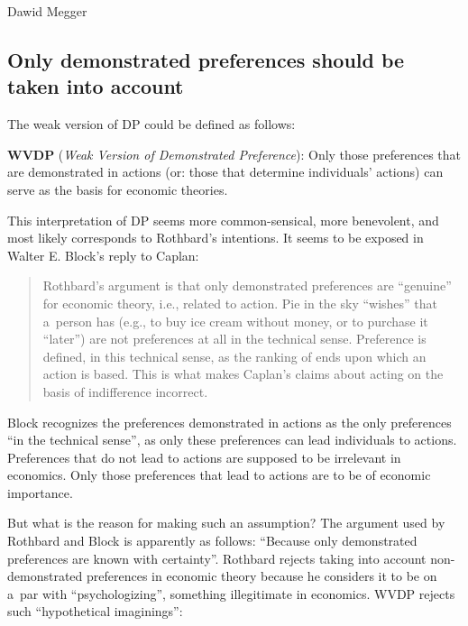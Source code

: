 \begin{artengenv}{Dawid Megger}
\subsection{Only demonstrated preferences should be taken into account}



The weak version of DP could be defined as follows:

\medskip

\noindent \textbf{WVDP} (\textit{Weak Version of Demonstrated Preference}): Only those preferences that are demonstrated in actions (or: those that determine individuals' actions) can serve as the basis for economic theories.

\medskip

This interpretation of DP seems more common-sensical, more benevolent, and most likely corresponds to Rothbard's intentions. It seems to be exposed in Walter E. Block's reply to Caplan:



\begin{quote}
Rothbard's argument is that only demonstrated preferences are ``genuine'' for economic theory, i.e., related to action. Pie in the sky ``wishes'' that a~person has (e.g., to buy ice cream without money, or to purchase it ``later'') are not preferences at all in the technical sense. Preference is defined, in this technical sense, as the ranking of ends upon which an action is based. This is what makes Caplan's claims about acting on the basis of indifference incorrect. 
\parencite[][p.23]{block_austrian_1999}%
\end{quote}




Block recognizes the preferences demonstrated in actions as the only preferences ``in the technical sense'', as only these preferences can lead individuals to actions. Preferences that do not lead to actions are supposed to be irrelevant in economics. Only those preferences that lead to actions are to be of economic importance.



But what is the reason for making such an assumption? The argument used by Rothbard and Block is apparently as follows: ``Because only demonstrated preferences are known with certainty''. Rothbard rejects taking into account non-demonstrated preferences in economic theory because he considers it to be on a~par with ``psychologizing'', something illegitimate in economics. WVDP rejects such ``hypothetical imaginings'':




\end{artengenv}
